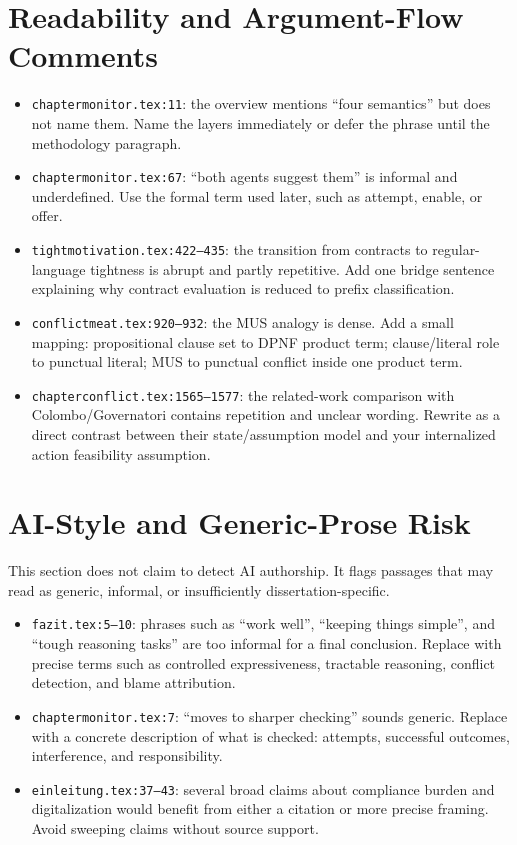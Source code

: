 \documentclass[11pt,a4paper]{article}
\newcommand{\loc}[1]{\texttt{#1}}
\begin{document}
\section*{Readability and Argument-Flow Comments}

\begin{itemize}
  \item \loc{chaptermonitor.tex:11}: the overview mentions ``four semantics'' but
  does not name them. Name the layers immediately or defer the phrase until the
  methodology paragraph.
  \item \loc{chaptermonitor.tex:67}: ``both agents suggest them'' is informal and
  underdefined. Use the formal term used later, such as attempt, enable, or offer.
  \item \loc{tightmotivation.tex:422--435}: the transition from contracts to
  regular-language tightness is abrupt and partly repetitive. Add one bridge
  sentence explaining why contract evaluation is reduced to prefix classification.
  \item \loc{conflictmeat.tex:920--932}: the MUS analogy is dense. Add a small
  mapping: propositional clause set to DPNF product term; clause/literal role to
  punctual literal; MUS to punctual conflict inside one product term.
  \item \loc{chapterconflict.tex:1565--1577}: the related-work comparison with
  Colombo/Governatori contains repetition and unclear wording. Rewrite as a direct
  contrast between their state/assumption model and your internalized action
  feasibility assumption.
\end{itemize}

\section*{AI-Style and Generic-Prose Risk}

This section does not claim to detect AI authorship. It flags passages that may
read as generic, informal, or insufficiently dissertation-specific.
\begin{itemize}
  \item \loc{fazit.tex:5--10}: phrases such as ``work well'', ``keeping things
  simple'', and ``tough reasoning tasks'' are too informal for a final conclusion.
  Replace with precise terms such as controlled expressiveness, tractable reasoning,
  conflict detection, and blame attribution.
  \item \loc{chaptermonitor.tex:7}: ``moves to sharper checking'' sounds generic.
  Replace with a concrete description of what is checked: attempts, successful
  outcomes, interference, and responsibility.
  \item \loc{einleitung.tex:37--43}: several broad claims about compliance burden
  and digitalization would benefit from either a citation or more precise framing.
  Avoid sweeping claims without source support.
\end{itemize}
\end{document}
